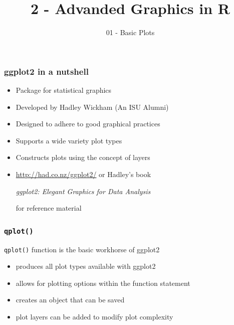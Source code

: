 \documentclass{beamer}\usepackage[]{graphicx}\usepackage[]{color}
\title[Advanced Graphics in R ]{2 - Advanded Graphics in R}
\subtitle{01 - Basic Plots}
\date{\hspace{1in}}
\institute[ISU]{Iowa State University}
\begin{document}
\begin{frame}
    \maketitle
\end{frame}


\begin{frame}
\frametitle{ggplot2 in a nutshell}
    \begin{itemize}
        \item Package for statistical graphics
        \item Developed by Hadley Wickham (An ISU Alumni)
        \item Designed to adhere to good graphical practices
        \item Supports a wide variety plot types
        \item Constructs plots using the concept of layers\medskip
        \item \url{http://had.co.nz/ggplot2/} or Hadley's book \begin{center}\emph{ggplot2: Elegant Graphics for Data Analysis}\end{center} for reference material
    \end{itemize}    
\end{frame}


\begin{frame}
\frametitle{\texttt{qplot()}}
  \texttt{qplot()} function is the basic workhorse of ggplot2\bigskip
    \begin{itemize}
        \item produces all plot types available with ggplot2\medskip
        \item allows for plotting options within the function statement\medskip
        \item creates an object that can be saved\medskip
        \item plot layers can be added to modify plot complexity
    \end{itemize}    
\end{frame}

\end{document}
